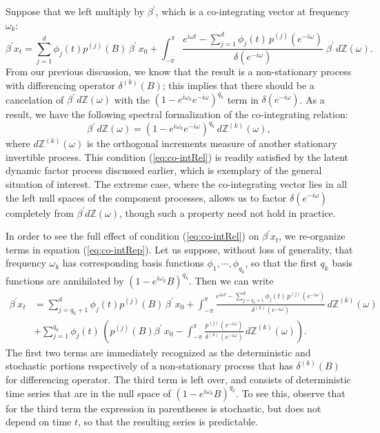 \documentclass[a4paper]{book}
\def\ZZ{\mathbb Z}
\begin{document}
 Suppose that we left multiply by $\beta^{\prime}$,
 which is a co-integrating vector at frequency $\omega_k$:
\begin{equation}
 \label{eq:co-intRep}
  \beta^{\prime} x_t = \sum_{j=1}^d \phi_j (t) p^{(j)} (B) \, \beta^{\prime} \, x_{0} + \int_{-\pi}^{\pi}
 \frac{ e^{i \omega t} - \sum_{j=1}^d \phi_j (t) \, p^{(j)} ( e^{-i \omega
 } )}{ \delta (e^{-i \omega}) } \; \beta^{\prime} \, d \ZZ
 (\omega).
\end{equation}
  From our previous discussion, we know that the result is a non-stationary
 process with differencing operator $\delta^{(k)} (B)$; this implies
 that there should be a cancelation of $\beta^{\prime} \, d\ZZ
 (\omega)$ with the ${(1 - e^{i \omega_{k}} e^{-i\omega}
 )}^{q_{k}}$ term in $\delta (e^{-i \omega})$.  As a result, we
 have the following spectral formalization of the co-integrating
 relation:
\begin{equation}
\label{eq:co-intRel}
 \beta^{\prime} \, d\ZZ (\omega) = {(1 - e^{i \omega_{k}} e^{-i\omega}
 )}^{q_{k}} \, d\ZZ^{(k)} (\omega),
\end{equation}
 where $d \ZZ^{(k)} (\omega)$ is the orthogonal increments measure
 of another stationary invertible process.  This condition
 (\ref{eq:co-intRel}) is readily satisfied by the latent dynamic
 factor process discussed earlier, which is exemplary of the general
 situation of interest.  The extreme case, where the co-integrating
 vector lies in all the left null spaces of the component processes,
 allows us to factor $\delta (e^{-i \omega})$ completely from
 $\beta^{\prime} d \ZZ (\omega)$, though such a property need not
 hold in practice.  

In order to see the full effect of condition
 (\ref{eq:co-intRel}) on $\beta^{\prime} x_t$, we re-organize terms
 in equation (\ref{eq:co-intRep}).  Let us suppose, without loss of
 generality, that frequency $\omega_k$ has corresponding basis
 functions $\phi_1, \cdots, \phi_{q_k}$, so that the first $q_k$
 basis functions are annihilated by ${(1 - e^{i \omega_k}
 B)}^{q_k}$.  Then we can write
\begin{align*}
 \beta^{\prime} x_t & = \sum_{j= q_k + 1}^d \phi_j (t) p^{(j)} (B) \, \beta^{\prime} \, x_{0}
  + \int_{-\pi}^{\pi} \frac{ e^{i \omega t} - \sum_{j= q_k + 1}^d \phi_j (t) \, p^{(j)} ( e^{-i \omega
 } )}{ \delta^{(k)} (e^{-i \omega}) } \, d \ZZ^{(k)}
 (\omega) \\
 & + \sum_{j=1}^{q_k} \phi_j (t) \,  \left(p^{(j)}
 (B)  \beta^{\prime} \,  x_0 - \int_{-\pi}^{\pi} \frac{ p^{(j)} (e^{-i \omega}) }{
 \delta^{(k)} (e^{-i \omega}) } \, d\ZZ^{(k)} (\omega) \right).
\end{align*}
 The first two terms are immediately recognized as the deterministic
 and stochastic portions respectively of a non-stationary process
 that has $\delta^{(k)} (B)$ for differencing operator.  The third
 term is left over, and consists of deterministic time series that
 are in the null space of ${(1 - e^{i \omega_k}
 B)}^{q_k}$.  To see this, observe that for the third term the expression in parentheses is
stochastic, but does not depend on time $t$, so that the resulting series is predictable.
\end{document}
